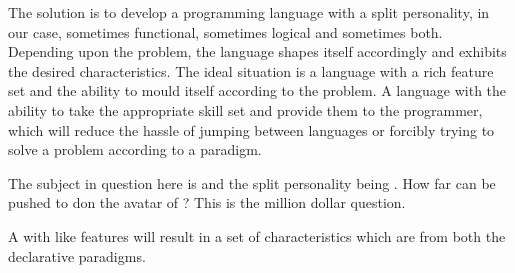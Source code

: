 \documentclass[thesis-solanki.tex]{subfiles}
\begin{document}
The solution is to develop a programming language with a split personality, in our case, sometimes functional,
sometimes logical and sometimes both.
Depending upon the problem, the language shapes itself accordingly and exhibits the desired characteristics.
The ideal situation is a language with a rich feature set and the ability to mould itself according to the problem.
A language with the ability to take the appropriate skill set and provide them to the programmer, which will reduce
the hassle of jumping between languages or forcibly trying to solve a problem according to a
paradigm.

The subject in question here is  and the split personality being . How far can  be pushed to
don the avatar of ?
This is the million dollar question.

A  with  like features will result in a set of characteristics which are from
both the declarative paradigms.
\end{document}
